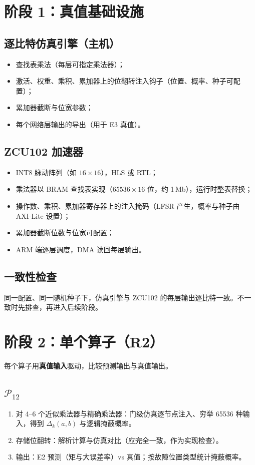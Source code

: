 \documentclass[11pt,a4paper]{ctexart}
\begin{document}
\section{阶段 1：真值基础设施}
\subsection{逐比特仿真引擎（主机）}
\begin{itemize}[leftmargin=*]
  \item 查找表乘法（每层可指定乘法器）；
  \item 激活、权重、乘积、累加器上的位翻转注入钩子（位置、概率、种子可配置）；
  \item 累加器截断与位宽参数；
  \item 每个网络层输出的导出（用于 E3 真值）。
\end{itemize}

\subsection{ZCU102 加速器}
\begin{itemize}[leftmargin=*]
  \item INT8 脉动阵列（如 $16\times16$），HLS 或 RTL；
  \item 乘法器以 BRAM 查找表实现（$65536\times16$ 位，约 1\,Mb），运行时整表替换；
  \item 操作数、乘积、累加器寄存器上的注入掩码（LFSR 产生，概率与种子由 AXI-Lite 设置）；
  \item 累加器截断位数与位宽可配置；
  \item ARM 端逐层调度，DMA 读回每层输出。
\end{itemize}

\subsection{一致性检查}
同一配置、同一随机种子下，仿真引擎与 ZCU102 的每层输出逐比特一致。不一致时先排查，再进入后续阶段。

\section{阶段 2：单个算子（R2）}
每个算子用\textbf{真值输入}驱动，比较预测输出与真值输出。

\subsection{$\mathcal P_{12}$}
\begin{enumerate}[leftmargin=*]
  \item 对 4--6 个近似乘法器与精确乘法器：门级仿真逐节点注入、穷举 65536 种输入，得到 $\Delta_k(a,b)$ 与逻辑掩蔽概率。
  \item 存储位翻转：解析计算与仿真对比（应完全一致，作为实现检查）。
  \item 输出：E2 预测（矩与大误差率）vs 真值；按故障位置类型统计掩蔽概率。
\end{enumerate}
\end{document}
